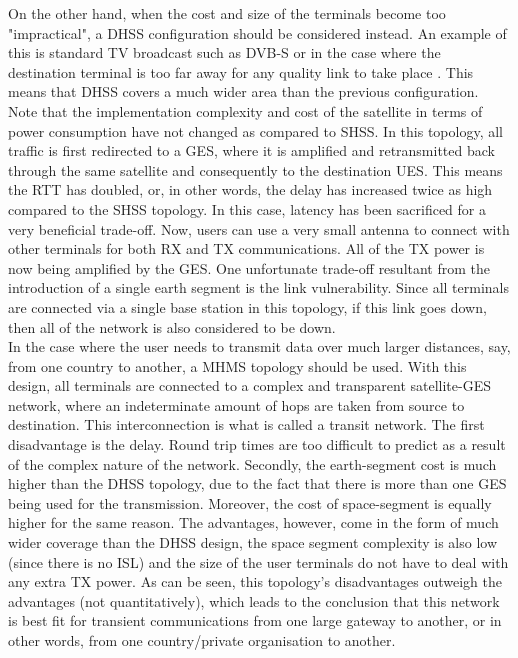 On the other hand, when the cost and size of the terminals become too "impractical", a DHSS configuration should be considered instead. An example of this is standard TV broadcast such as DVB-S or in the case where the destination terminal is too far away for any quality link to take place\autocite{book1_pp87} . This means that DHSS covers a much wider area than the previous configuration. Note that the implementation complexity and cost of the satellite in terms of power consumption have not changed as compared to SHSS.
In this topology, all traffic is first redirected to a GES, where it is amplified and retransmitted back through the same satellite and consequently to the destination UES. This means the RTT has doubled, or, in other words, the delay has increased twice as high compared to the SHSS topology. In this case, latency has been sacrificed for a very beneficial trade-off. Now, users can use a very small antenna to connect with other terminals for both RX and TX communications. All of the TX power is now being amplified by the GES. One unfortunate trade-off resultant from the introduction of a single earth segment is the link vulnerability. Since all terminals are connected via a single base station in this topology, if this link goes down, then all of the network is also considered to be down.\\

In the case where the user needs to transmit data over much larger distances, say, from one country to another, a MHMS topology should be used. With this design, all terminals are connected to a complex and transparent satellite-GES network, where an indeterminate amount of hops are taken from source to destination. This interconnection is what is called a transit network. The first disadvantage is the delay. Round trip times are too difficult to predict as a result of the complex nature of the network. Secondly, the earth-segment cost is much higher than the DHSS topology, due to the fact that there is more than one GES being used for the transmission. Moreover, the cost of space-segment is equally higher for the same reason. The advantages, however, come in the form of much wider coverage than the DHSS design, the space segment complexity is also low (since there is no ISL) and the size of the user terminals do not have to deal with any extra TX power. As can be seen, this topology's disadvantages outweigh the advantages (not quantitatively), which leads to the conclusion that this network is best fit for transient communications from one large gateway to another, or in other words, from one country/private organisation to another.\\

